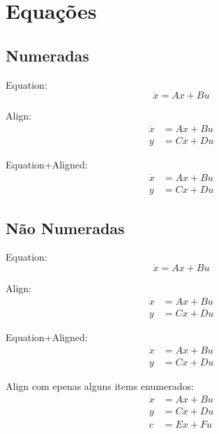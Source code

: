 
\chapter{Equações}
\section{Numeradas}

Equation:
\begin{equation}
  \dot{x} = Ax+Bu
\end{equation}

Align:
\begin{align}
  \dot{x} & = Ax+Bu \\
  y       & =Cx+Du
\end{align}

Equation+Aligned:
\begin{equation}
  \begin{aligned}
    \dot{x} & = Ax+Bu \\
    y       & =Cx+Du
  \end{aligned}
\end{equation}

\section{Não Numeradas}

Equation:
\begin{equation*}
  \dot{x} = Ax+Bu
\end{equation*}

Align:
\begin{align*}
  \dot{x} & = Ax+Bu \\
  y       & =Cx+Du
\end{align*}

Equation+Aligned:
\begin{equation*}
  \begin{aligned}
    \dot{x} & = Ax+Bu \\
    y       & =Cx+Du
  \end{aligned}
\end{equation*}

Align com epenas alguns items enumerados:
\begin{align}
  \dot{x} & = Ax+Bu           \\
  y       & = Cx+Du           \\
  c       & = Ex+Fu \nonumber %
\end{align}
